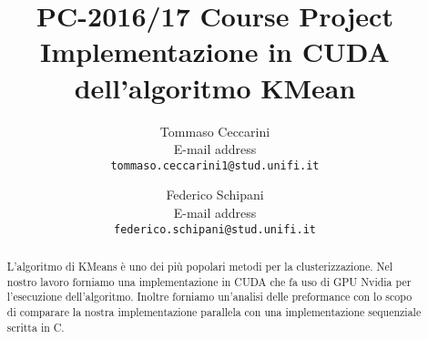 \documentclass[10pt,twocolumn,letterpaper]{article}
\begin{document}
\title{PC-2016/17 Course Project \\
Implementazione in CUDA dell'algoritmo KMean}

\author{Tommaso Ceccarini \\
E-mail address\\
{\tt\small tommaso.ceccarini1@stud.unifi.it}
\and
Federico Schipani\\
E-mail address\\
{\tt\small federico.schipani@stud.unifi.it}
}

\maketitle
\thispagestyle{empty}

\begin{abstract}
	L'algoritmo di KMeans è uno dei più popolari metodi per la clusterizzazione. Nel nostro lavoro forniamo una implementazione in CUDA che fa uso 
	di GPU Nvidia per l'esecuzione dell'algoritmo. Inoltre forniamo un'analisi delle preformance con lo scopo di comparare la nostra implementazione parallela con una implementazione sequenziale scritta in C.
\end{abstract}

\end{document}

